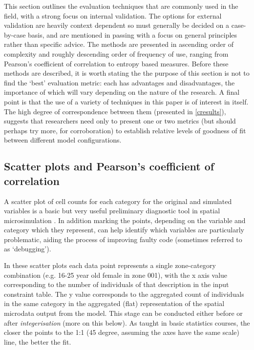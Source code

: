 \documentclass[a4paper,10pt]{article}
\begin{document}
This section outlines the evaluation techniques that are commonly used in the
field, with a strong focus on internal validation. The options for external
validation are heavily context dependent so must generally be decided on a
case-by-case basis, and are mentioned in passing with a focus on general principles
rather than specific advice. The methods are presented in ascending order of complexity
and roughly descending order of frequency of use, ranging from Pearson's coefficient of
correlation to entropy based measures. Before these methods are described, it is
worth stating the the purpose of this section is not to find the `best' evaluation metric:
each has advantages and disadvantages, the importance of which will vary depending on the
nature of the research. A final point is that the use of a variety of techniques in this paper
is of interest in itself. The high degree of correspondence between them (presented in \cref{cresults}),
suggests that researchers need only to present one or two metrics (but should
perhaps try more, for corroboration) to establish relative levels of goodness of fit between
different model configurations.

\subsection{Scatter plots and Pearson's coefficient of correlation}
A scatter plot of cell counts for each category for the original and simulated variables is
a basic but very useful preliminary diagnostic tool in spatial microsimulation
\citep{Ballas2005;Edwards2009}.
In addition marking the points, depending on the
variable and category %
which they represent, can help identify which variables are particularly problematic,
aiding the process of improving faulty code (sometimes referred to as `debugging').

In these scatter plots each data point represents a single zone-category
combination (e.g. 16-25 year old female in zone 001), with the x axis value corresponding
to the number of individuals of that description in the input constraint table.
The y value corresponds to the
aggregated count of individuals in the same category in the aggregated
(flat) representation of the spatial microdata output from the model. %
This stage can be conducted either before or after \emph{integerisation}
(more on this below). As taught in basic statistics courses, the closer the points to the
1:1 (45 degree, assuming the axes have the same scale) line, the better the fit.
\end{document}
